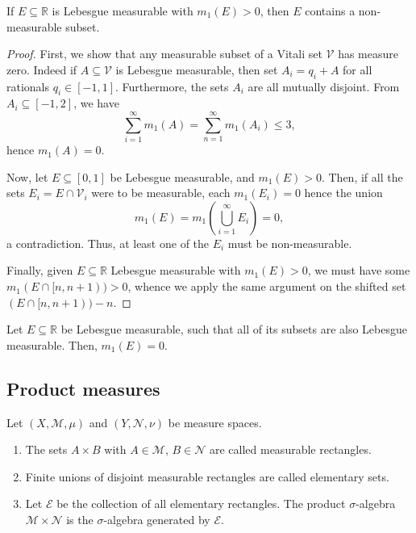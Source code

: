\documentclass[11pt]{article}
\newcommand{\R}{\mathbb{R}}
\newcommand{\M}{\mathcal{M}}
\newcommand{\MN}{\mathcal{N}}
\theoremstyle{definition}
\theoremstyle{remark}
\numberwithin{equation}{section}
\begin{document}
    \begin{theorem}
        If $E \subseteq \R$ is Lebesgue measurable with $m_1(E) > 0$, then $E$
        contains a non-measurable subset.
    \end{theorem}
    \begin{proof}
        First, we show that any measurable subset of a Vitali set $\mathcal{V}$ has
        measure zero. Indeed if $A \subseteq \mathcal{V}$ is Lebesgue measurable,
        then set $A_i = q_i + A$ for all rationals $q_i \in [-1, 1]$. Furthermore,
        the sets $A_i$ are all mutually disjoint. From $A_i \subseteq [-1, 2]$, we
        have \[
            \sum_{i = 1}^\infty m_1(A) = \sum_{n = 1}^\infty m_1(A_i) \leq 3,
        \] hence $m_1(A) = 0$.

        Now, let $E \subseteq [0, 1]$ be Lebesgue measurable, and $m_1(E) > 0$. Then,
        if all the sets $E_i = E \cap \mathcal{V}_i$ were to be measurable, each
        $m_1(E_i) = 0$ hence the union \[
            m_1(E) = m_1\left(\bigcup_{i = 1}^\infty E_i\right) = 0,
        \] a contradiction. Thus, at least one of the $E_i$ must be non-measurable.

        Finally, given $E \subseteq \R$ Lebesgue measurable with $m_1(E) > 0$, we
        must have some $m_1(E \cap [n, n + 1)) > 0$, whence we apply the same
        argument on the shifted set $(E \cap [n, n + 1)) - n$.
    \end{proof}
    \begin{corollary}
        Let $E \subseteq \R$ be Lebesgue measurable, such that all of its subsets
        are also Lebesgue measurable. Then, $m_1(E) = 0$.
    \end{corollary}



    \subsection{Product measures}

    \begin{definition}
        Let $(X, \M, \mu)$ and $(Y, \MN, \nu)$ be measure spaces.
        \begin{enumerate}
            \itemsep0em
            \item The sets $A \times B$ with $A \in \M$, $B \in \MN$ are called
            measurable rectangles.
            \item Finite unions of disjoint measurable rectangles are called
            elementary sets.
            \item Let $\mathcal{E}$ be the collection of all elementary rectangles.
            The product $\sigma$-algebra $\M \times \MN$ is the $\sigma$-algebra
            generated by $\mathcal{E}$.
        \end{enumerate}
    \end{definition}
\end{document}
